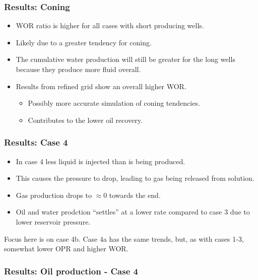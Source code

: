 \begin{frame}
    \frametitle{Results: Coning}
    \begin{itemize}
        \item WOR ratio is higher for all cases with short producing wells.
        \item Likely due to a greater tendency for coning.
        \item The cumulative water production will still be greater for the long wells because they produce more fluid overall.
        \pause
        \item Results from refined grid show an overall higher WOR.
        \begin{itemize}
            \item Possibly more accurate simulation of coning tendencies.
            \item Contributes to the lower oil recovery.
        \end{itemize}
    \end{itemize}
\end{frame}


\begin{frame}
    \frametitle{Results: Case 4}
    \begin{itemize}
        \item In case 4 less liquid is injected than is being produced.
        \pause
        \item This causes the pressure to drop, leading to gas being released from solution.
        \item Gas production drops to $\approx 0$ towards the end.
        \pause
        \item Oil and water prodction ``settles'' at a lower rate compared to case 3 due to lower reservoir pressure.
    \end{itemize}
    \pause
    \begin{remark}
        Focus here is on case 4b. Case 4a has the same trends, but, as with cases 1-3, somewhat lower OPR and higher WOR.
    \end{remark}
\end{frame}


\begin{frame}
    \frametitle{Results: Oil production - Case 4}
    \centerline{}
\end{frame}

